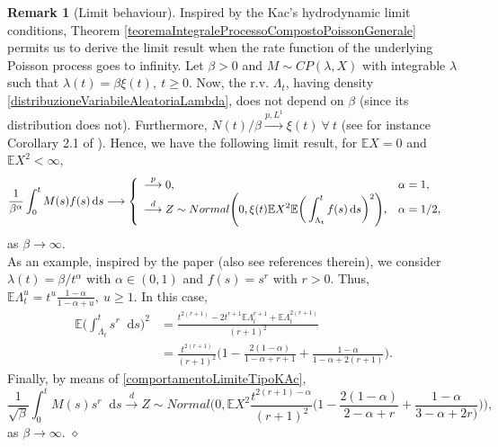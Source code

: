\documentclass[12pt, twoside, english, headsepline]{article}
\newcommand*\dif{\mathop{}\!\mathrm{d}}  %
\theoremstyle{definition} %
\newtheorem{remark}{Remark}[section] %
\numberwithin{equation}{section} %
\begin{document}
\begin{remark}[Limit behaviour]
	Inspired by the Kac's hydrodynamic limit conditions, Theorem \ref{teoremaIntegraleProcessoCompostoPoissonGenerale} permits us to derive the limit result when the rate function of the underlying Poisson process goes to infinity. Let $\beta >0$ and $M\sim CP(\lambda, X)$ with integrable $\lambda$ such that $\lambda(t) = \beta \xi(t),\ t\ge0$. Now, the r.v. $\Lambda_{t}$, having density \eqref{distribuzioneVariabileAleatoriaLambda}, does not depend on $\beta$ (since its distribution does not). Furthermore, $N(t)/\beta \stackrel{p,L^1}{\longrightarrow} \xi(t)\ \forall\ t$ (see for instance Corollary 2.1 of \cite{CO202}). Hence, we have the following limit result, for $\mathbb{E}X = 0$ and $\mathbb{E}X^2<\infty$,
	\begin{equation}\label{comportamentoLimiteTipoKAc}
		\frac{1}{\beta^\alpha} \int_0^t M(s)f(s)\dif s 
	 \longrightarrow \begin{cases}
			\begin{array}{l l}
				\displaystyle \stackrel{p}{\longrightarrow} 0, & \alpha = 1,\\
				\displaystyle \stackrel{d}{\longrightarrow} Z\sim Normal\Bigg(0, \xi(t) \mathbb{E}X^2 \mathbb{E}\bigg(\int_{\Lambda_t}^t f(s)\dif s\bigg)^2\Bigg), & \alpha = 1/2,
			\end{array}
		\end{cases}
	\end{equation}
	as $\beta\longrightarrow\infty$.
	\\
	
	As an example, inspired by the paper \cite{MS2025} (also see references therein), we consider $\lambda(t) = \beta /t^{\alpha}$ with $\alpha \in(0,1)$ and $f(s) = s^r$ with $r>0$. Thus, $\mathbb{E}\Lambda_t^u = t^u \frac{1-\alpha}{1-\alpha+u}, \ u\ge 1$. In this case, 
	\begin{align*}
		\mathbb{E} \bigg(\int_{\Lambda_t}^t s^r\dif s\bigg)^2 & = \frac{t^{2(r+1)}-2t^{r+1}\mathbb{E}\Lambda_t^{r+1}+\mathbb{E}\Lambda_t^{2(r+1)}}{(r+1)^2} \\
		&=\frac{t^{2(r+1)}}{(r+1)^2} \bigg( 1-\frac{2(1-\alpha)}{1-\alpha+r+1}+\frac{1-\alpha}{1-\alpha+2(r+1)}\bigg).
		\end{align*}
		Finally, by means of \eqref{comportamentoLimiteTipoKAc},
$$\frac{1}{\sqrt{\beta}} \int_0^t M(s)s^r\dif s \stackrel{d}{\longrightarrow} Z\sim Normal\Bigg(0, \mathbb{E}X^2 \frac{t^{2(r+1)-\alpha}}{(r+1)^2} \bigg( 1-\frac{2(1-\alpha)}{2-\alpha+r}+\frac{1-\alpha}{3-\alpha+2r)}\bigg)\Bigg),  $$
	as $\beta \longrightarrow\infty$.
	\hfill$\diamond$
\end{remark}
\end{document}
